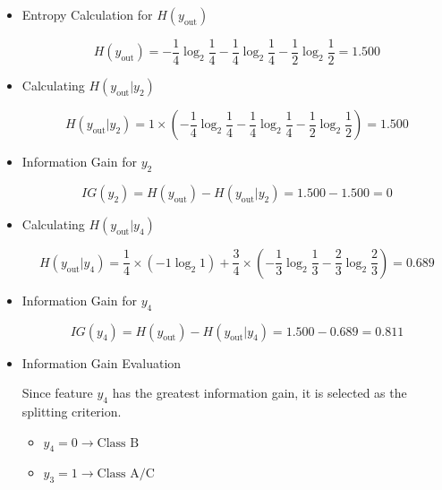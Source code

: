 \documentclass[12pt]{article}
\begin{document}
\begin{enumerate}[leftmargin=\labelsep, label=\textbf{\arabic*.)}]
\begin{itemize}
              \item Entropy Calculation for \( H(y_{\text{out}}) \)

                    \[
                        H(y_{\text{out}}) = -\frac{1}{4} \log_2 \frac{1}{4} - \frac{1}{4} \log_2 \frac{1}{4} - \frac{1}{2} \log_2 \frac{1}{2} = 1.500
                    \]

              \item Calculating \( H(y_{\text{out}}|y_2) \)

                    \[
                        H(y_{\text{out}}|y_2) = 1 \times \left( -\frac{1}{4} \log_2 \frac{1}{4} -\frac{1}{4} \log_2 \frac{1}{4} -\frac{1}{2} \log_2 \frac{1}{2}\right) = 1.500
                    \]

              \item Information Gain for \( y_2 \)

                    \[
                        IG(y_2) = H(y_{\text{out}}) - H(y_{\text{out}}|y_2) = 1.500 - 1.500 = 0
                    \]

              \item Calculating \( H(y_{\text{out}}|y_4) \)

                    \[
                        H(y_{\text{out}}|y_4) = \frac{1}{4} \times \left( - 1 \log_2 1 \right) + \frac{3}{4} \times \left( -\frac{1}{3} \log_2 \frac{1}{3} - \frac{2}{3} \log_2 \frac{2}{3} \right) = 0.689
                    \]

              \item Information Gain for \( y_4 \)

                    \[
                        IG(y_4) = H(y_{\text{out}}) - H(y_{\text{out}}|y_4) = 1.500 - 0.689 = 0.811
                    \]

              \item Information Gain Evaluation

                    Since feature \( y_4 \) has the greatest information gain, it is selected as the splitting criterion.

                    \begin{itemize}
                        \item \( y_4 = 0 \rightarrow \text{Class B} \)
                        \item \( y_3 = 1 \rightarrow \text{Class A/C} \)
                    \end{itemize}


\end{itemize}
\end{enumerate}
\end{document}
